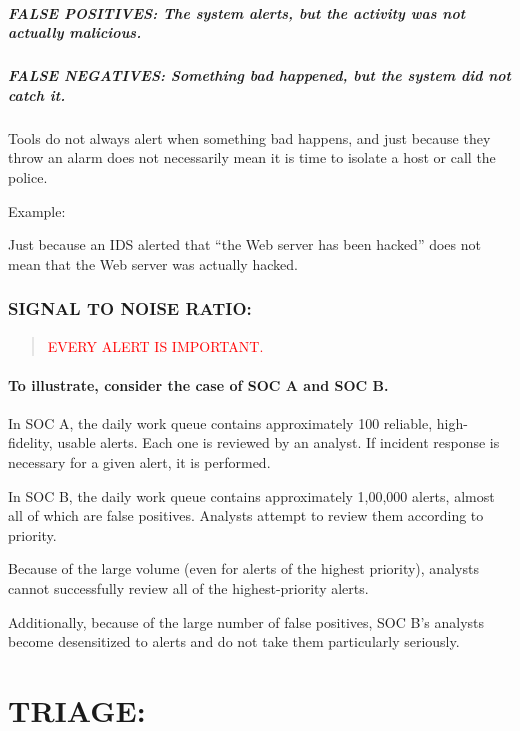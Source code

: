 \documentclass[10pt,british,english]{article}
\begin{document}
\subsubsection{FALSE POSITIVES: The system alerts, but the activity was not actually
malicious.}

\subsubsection{FALSE NEGATIVES: Something bad happened, but the system did not catch
it.}

Tools do not always alert when something bad happens, and just because
they throw an alarm does not necessarily mean it is time to isolate
a host or call the police. 

Example:

Just because an IDS alerted that \textquotedblleft the Web server
has been hacked\textquotedblright{} does not mean that the Web server
was actually hacked.

\section{SIGNAL TO NOISE RATIO: }
\begin{quotation}
\noindent \textcolor{red}{EVERY ALERT IS IMPORTANT.}
\end{quotation}

\subsection{To illustrate, consider the case of SOC A and SOC B. }

In SOC A, the daily work queue contains approximately 100 reliable,
high-fidelity, usable alerts. Each one is reviewed by an analyst.
If incident response is necessary for a given alert, it is performed.

In SOC B, the daily work queue contains approximately 1,00,000 alerts,
almost all of which are false positives. Analysts attempt to review
them according to priority. 

Because of the large volume (even for alerts of the highest priority),
analysts cannot successfully review all of the highest-priority alerts. 

Additionally, because of the large number of false positives, SOC
B's analysts become desensitized to alerts and do not take them particularly
seriously.

\part{TRIAGE:}
\end{document}
